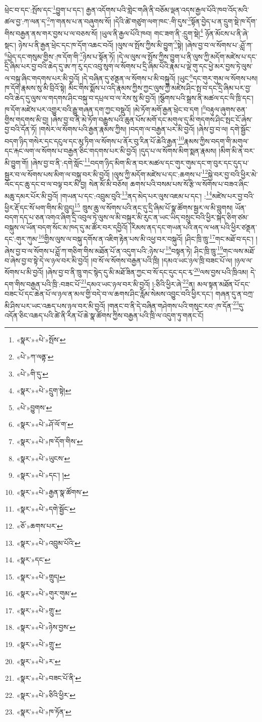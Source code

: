ཕྲེང་བ་དང་:སྤོས་དང་\footnote{«སྣར་»«པེ་»སྤོས་}བྱུག་པ་དང་། རྒྱན་འདོགས་པའི་གླེང་གཞི་ནི་བཅོམ་ལྡན་འདས་རྒྱལ་པོའི་ཁབ་འོད་མའི་ཚལ་བྱ་:ཀ་ལན་ད་\footnote{«པེ་»ཀ་ལནྟ་}ཀ་གནས་པ་ན་བཞུགས་སོ། །དེའི་ཚེ་གཙུག་ལག་ཁང་:གི་དུས་\footnote{«པེ་»གི་དུ་}སྟོན་བྱེད་པ་ན་དྲུག་སྡེ་ཁ་དོག་གིས་བརྒྱན་ནས་གར་བྱས་པ་ལ་བཅས་སོ། །ཡུལ་ནི་རྒྱལ་པོའི་ཁབ། གང་ཟག་ནི་:དྲུག་སྡེ།\footnote{«སྣར་»«པེ་»དྲུག་སྟེ།} ཉོན་མོངས་པ་ནི་ཞེ་སྡང་། ཉེས་པ་ནི་རྒྱན་ཕྲེང་དང་ཁ་དོག་འཆང་བའོ། །ལུས་ལ་སྤོས་ཀྱིས་མི་བྱུག་\footnote{«པེ་»བྱུགས་}སྟེ། །ཞེས་བྱ་བ་ལ་སོགས་པ་:ཤློ་ཀ་\footnote{«སྣར་»«པེ་»ཤོ་ལོ་ག་}ཕྱེད་དང་གསུམ་གྱིས་:ཁ་དོག་གི་\footnote{«སྣར་»«པེ་»ཁ་དོག་གིས་}ཉེས་པ་སྟོན་ཏོ། །དེ་ལ་ལུས་ལ་སྤོས་ཀྱིས་བྱུག་པ་ནི་ལུས་ཀྱི་མདོག་མཛེས་པ་དང་དྲི་ཞིམ་པར་བྱ་བའི་ཆེད་དུ་ཨ་ཀ་རུ་དང་འབུ་སུག་ལ་སོགས་པ་དྲི་ཞིམ་པོའི་རྣམ་པ་ལྡེ་གུ་དང་ཕྱེ་མར་བྱས་ཏེ་ལུས་ལ་བསྐུ་ཞིང་གདགས་པར་མི་བྱའོ། །དེ་བཞིན་དུ་ཙནྡན་ལ་སོགས་པ་མི་བསྐུའོ། །ཡུང་\footnote{«སྣར་»«པེ་»ཡུངས་}དང་གུར་གུམ་ལ་སོགས་པས། ཁ་དོག་རྣམས་སུ་མི་བྲིའོ་སྟེ། མིང་གིས་སྨོས་པ་འདི་རྣམས་ཀྱིས་ཀྱང་ལུས་ཀྱི་མཛེས་ཤིང་སྤ་བ་དང་དྲི་ཞིམ་པར་བྱ་བའི་ཆེད་དུ་ལུས་ལ་གདགས་ཤིང་བསྐུ་བ་དཔྲལ་བ་ལ་རེས་སུ་མི་བྱའོ། །སྩོགས་པའི་སྒྲས་ནི་མཚལ་དང་ལི་ཁྲི་དང་། ཁ་དོག་མཛེས་པར་འགྱུར་བའི་རྒྱུ་གཞན་དག་ཀྱང་བསྡུའོ། །མེ་ཏོག་མགོ་རྒྱན་ཕྲེང་བ་དག །\footnote{«སྣར་»«པེ་»དང་། །}བརྟུལ་ཞུགས་ཅན་གྱིས་གདགས་མི་བྱ། །ཞེས་བྱ་བ་ནི་མེ་ཏོག་བརྒྱུས་པའི་ཆུན་པོས་མགོ་དང་མགུལ་དུ་མི་གདགས་ཤིང་སྤང་ངོ་ཞེས་བྱ་བའི་དོན་ཏོ། །གསེར་ལ་སོགས་པའི་རྒྱན་རྣམས་ཀྱིས། །བདག་ལ་བརྒྱན་པར་མི་བྱའོ། །ཞེས་བྱ་བ་ལ། དགེ་སྦྱོང་བདག་ཉིད་གསེར་དང་དངུལ་དང་མུ་ཏིག་ལ་སོགས་པ་ནོར་བུ་རིན་པོ་ཆེའི་རྒྱན་\footnote{«སྣར་»«པེ་»རྒྱན་སྣ་ཚོགས་}རྣམས་ཀྱིས་བདག་གི་མགུལ་དང་རྐང་ལག་ལ་སོགས་པ་བརྒྱན་ཅིང་གདགས་པར་མི་བྱའོ། །དུད་པ་ལ་སོགས་མིག་སྨན་རྣམས། །མིག་མི་ན་བར་མི་བྱུག་གོ། །ཞེས་བྱ་བ་ནི་:དགེ་སློང་\footnote{«སྣར་»«པེ་»དགེ་སྦྱོང་}བདག་ཉིད་མིག་མི་ན་བར་མཚལ་དང་གུར་གུམ་དང་ག་བུར་དང་དུད་པ་སྦྱར་བ་ལ་སོགས་པས་མིག་ལ་བསྐུ་བར་མི་བྱའོ། །ལུས་ཀྱི་མདོག་མཛེས་པ་དང་:ཆགས་པ་\footnote{«ཅོ་»ཆགས་པར་}སྐྱེ་བར་བྱ་བའི་ཕྱིར་མེ་ལོང་དང་ཆུ་དང་བ་ལ་བལྟ་བར་མི་བྱ། སེན་མོ་མི་བཅོས། ཆགས་པའི་བསམ་པས་སོ་རྩི་ལ་སོགས་པ་བཟའ་ཞིང་མཆུ་དམར་པོར་མི་བྱའོ། །གཡན་པ་དང་:འབྲུམ་བུའི་\footnote{«སྣར་»«པེ་»འབྲུམ་པོའི་}ནད་མེད་པར་ལུས་འཇམ་པ་དང་། :\footnote{«སྣར་»དང་}མཛེས་པར་བྱ་བའི་ཕྱིར་རྡོ་དང་སོ་ཕག་གིས་མི་བྲུད།\footnote{«སྣར་»«པེ་»གྲུད།} ཁྲུས་ཆུ་ལ་སོགས་པའི་ནང་དུ་དྲི་ཞིམ་པོ་སྣ་ཚོགས་སྦྱར་ལ་མི་བླུགས། ཡོན་བདག་དད་པ་ཅན་འགའ་ཞིག་དྲི་འབུལ་ཏེ་ལུས་ལ་མི་བསྐུར་མི་རུང་ན་ཡང་ཡིད་བསྲུང་བའི་ཕྱིར་སྐད་ཅིག་ཙམ་བསྐུས་ལ་ཡོན་བདག་སོང་མ་ཁད་དུ་མ་ཚོར་བར་དབྱིའོ། །རིམས་ནད་དང་གཡན་པའི་ནད་ལ་ཕན་པའི་ཕྱིར་ཙནྡན་དང་:གུར་ཀུམ་\footnote{«སྣར་»«པེ་»གུར་གུམ་}གྱིས་ལུས་ལ་བསྐུ་དགོས་ན་འཇིག་རྟེན་པས་མི་འཕྱ་བར་བསྐུའོ། །ཤིང་ཁྲི་ཁྲུ་\footnote{«སྣར་»«པེ་»གྲུ་}གང་མཐོ་བ་དང་། །ཞེས་བྱ་བ་ལ་སོགས་པ་ཤློ་ཀ་གཅིག་གིས་མཐོན་པོ་ན་འདུག་པའི་:ཉེས་པ་\footnote{«སྣར་»«པེ་»ཉེས་བྱས་}བསྟན་ཏེ། ཤིང་ཁྲི་ཁྲུ་\footnote{«སྣར་»«པེ་»གྲུ་}གང་ལས་མཐོ་བ་ཞེས་བྱ་བ་སྟེ་དེ་ལ་ཉལ་བར་མི་བྱའོ། །བ་སོ་ལ་སོགས་བརྒྱན་པའི་ཁྲི། །དམའ་ཡང་ཉལ་ཁྲི་བཟང་པོ་ལ། །ཉལ་ལ་སོགས་པ་མི་བྱའོ། །ཞེས་བྱ་བ་ནི་ཁྲུ་གང་སྙེད་དུ་མི་མཐོ་ཟིན་ཀྱང་བ་སོ་དང་དུང་དང་རྭ་\footnote{«སྣར་»«པེ་»ར་}ལས་བྱས་པའི་ཁྲིའམ། དེ་དག་གིས་བརྒྱན་པའི་ཁྲི་:བཟང་པོ་\footnote{«སྣར་»«པེ་»བཟང་པོ་ནི་}དམའ་ཡང་ཉལ་བར་མི་བྱའོ། །:ཅིའི་ཕྱིར་ཞེ་\footnote{«སྣར་»«པེ་»ཅིའི་ཕྱིར་}ན། མལ་སྟན་མཐོན་པོ་དང་བཟང་པོ་དང་ཆེན་པོ་ལ་ཉལ་ན་མལ་གྱི་བདེ་བ་ལ་ཆགས་ཤིང་རློམ་སེམས་འབྱུང་བའི་ཕྱིར་དང་། གཞན་དུ་ན་བཀྲ་མི་ཤིས་པར་ཡང་འཆད་པས་ཉལ་བར་མི་བྱའོ། །གནང་བ་ནི་དེ་བཞིན་གཤེགས་པའི་གསུང་རབ་:ཁ་དོན་\footnote{«སྣར་»«པེ་»ཁ་ཏོན་}དུ་འདོན་ཅིང་འཆད་པའི་ཚེ་ནི་རིན་པོ་ཆེ་སྣ་ཚོགས་ཀྱིས་བརྒྱན་པའི་ཁྲི་ལ་འདུག་ཏུ་གནང་ངོ། 